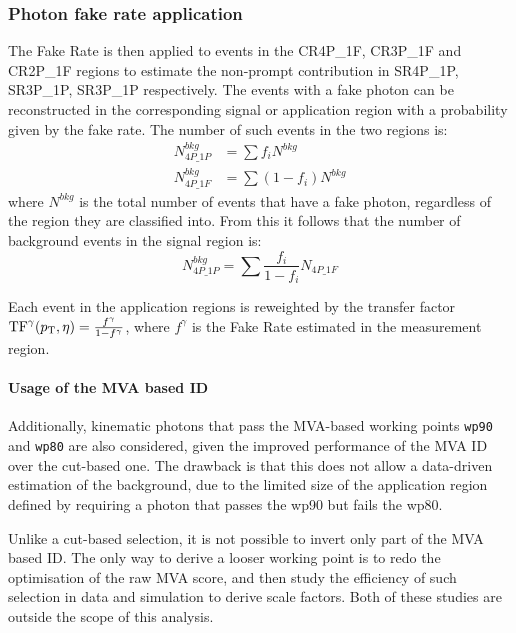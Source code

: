 \subsubsection{Photon fake rate application}
The Fake Rate is then applied to events in the CR4P\_1F, CR3P\_1F and CR2P\_1F regions to estimate the non-prompt contribution in SR4P\_1P, SR3P\_1P, SR3P\_1P respectively.
The events with a fake photon can be reconstructed in the corresponding signal or application region
with a probability given by the fake rate.
The number of such events in the two regions is:
\begin{equation}
  \begin{split}
    \label{eq:fakeRate_explanation_part1}
    N^{bkg}_{4P\_1P} &= \sum f_i N^{bkg}
    \\
    N^{bkg}_{4P\_1F} &= \sum ( 1-f_i ) N^{bkg}
  \end{split}
\end{equation}
where $N^{bkg}$ is the total number of events that have a fake photon, regardless of the region they are classified into.
From this it follows that the number of background events in the signal region is:
\begin{equation}
  \label{eq:fakeRate_explanation_part2}
  N^{bkg}_{4P\_1P} = \sum \frac{f_i}{1-f_i} N_{4P\_1F}
\end{equation}

Each event in the application regions is reweighted by the transfer factor
$\text{TF}^\gamma(p_{\mathrm{T}}, \eta) = \frac{f^\gamma}{1-f^\gamma}$,
where $f^\gamma$ is the Fake Rate estimated in the measurement region.

\paragraph{Usage of the MVA based ID\\}
Additionally, kinematic photons that pass the MVA-based working points \texttt{wp90} and \texttt{wp80} are also considered,
given the improved performance of the MVA ID over the cut-based one.
The drawback is that this does not allow a data-driven estimation of the \nonprompt background,
due to the limited size of the application region defined by requiring a photon that passes the wp90 but fails the wp80.

Unlike a cut-based selection, it is not possible to invert only part of the MVA based ID.
The only way to derive a looser working point is to redo the optimisation of the raw MVA score,
and then study the efficiency of such selection in data and simulation to derive scale factors.
Both of these studies are outside the scope of this analysis.

